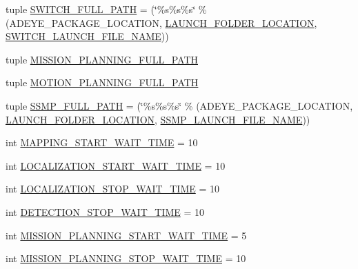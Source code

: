 \begin{DoxyCompactItemize}
\item 
tuple \hyperlink{namespacemanager_aa8c7bc9defad2d982a87f67d530919bc}{S\+W\+I\+T\+C\+H\+\_\+\+F\+U\+L\+L\+\_\+\+P\+A\+TH} = (\char`\"{}\%s\%s\%s\char`\"{} \% (A\+D\+E\+Y\+E\+\_\+\+P\+A\+C\+K\+A\+G\+E\+\_\+\+L\+O\+C\+A\+T\+I\+ON, \hyperlink{namespacemanager_aade405cb0881d91b45085d7bc0f392fa}{L\+A\+U\+N\+C\+H\+\_\+\+F\+O\+L\+D\+E\+R\+\_\+\+L\+O\+C\+A\+T\+I\+ON}, \hyperlink{namespacemanager_ac734eeabc7266313bdf84d100e8c5d77}{S\+W\+I\+T\+C\+H\+\_\+\+L\+A\+U\+N\+C\+H\+\_\+\+F\+I\+L\+E\+\_\+\+N\+A\+ME}))
\item 
tuple \hyperlink{namespacemanager_a3d3b5c1e3f4aa2f976afd6696fb753dc}{M\+I\+S\+S\+I\+O\+N\+\_\+\+P\+L\+A\+N\+N\+I\+N\+G\+\_\+\+F\+U\+L\+L\+\_\+\+P\+A\+TH}
\item 
tuple \hyperlink{namespacemanager_a53957d71bc1b0299a6de2499348c0c7b}{M\+O\+T\+I\+O\+N\+\_\+\+P\+L\+A\+N\+N\+I\+N\+G\+\_\+\+F\+U\+L\+L\+\_\+\+P\+A\+TH}
\item 
tuple \hyperlink{namespacemanager_af8b394f3a0664a2eb78bb3c7ec36dd97}{S\+S\+M\+P\+\_\+\+F\+U\+L\+L\+\_\+\+P\+A\+TH} = (\char`\"{}\%s\%s\%s\char`\"{} \% (A\+D\+E\+Y\+E\+\_\+\+P\+A\+C\+K\+A\+G\+E\+\_\+\+L\+O\+C\+A\+T\+I\+ON, \hyperlink{namespacemanager_aade405cb0881d91b45085d7bc0f392fa}{L\+A\+U\+N\+C\+H\+\_\+\+F\+O\+L\+D\+E\+R\+\_\+\+L\+O\+C\+A\+T\+I\+ON}, \hyperlink{namespacemanager_a48b997992b3e5973e9ccfe2ce7869790}{S\+S\+M\+P\+\_\+\+L\+A\+U\+N\+C\+H\+\_\+\+F\+I\+L\+E\+\_\+\+N\+A\+ME}))
\item 
int \hyperlink{namespacemanager_a114c53938453b5bea9a1d87feb0b8787}{M\+A\+P\+P\+I\+N\+G\+\_\+\+S\+T\+A\+R\+T\+\_\+\+W\+A\+I\+T\+\_\+\+T\+I\+ME} = 10
\item 
int \hyperlink{namespacemanager_a8bb090193ee690460b2d5da5d95d670a}{L\+O\+C\+A\+L\+I\+Z\+A\+T\+I\+O\+N\+\_\+\+S\+T\+A\+R\+T\+\_\+\+W\+A\+I\+T\+\_\+\+T\+I\+ME} = 10
\item 
int \hyperlink{namespacemanager_a8532d59e6a018744dbd2db6ffa66b1e1}{L\+O\+C\+A\+L\+I\+Z\+A\+T\+I\+O\+N\+\_\+\+S\+T\+O\+P\+\_\+\+W\+A\+I\+T\+\_\+\+T\+I\+ME} = 10
\item 
int \hyperlink{namespacemanager_a38f231e60cb3e2fa5c7a738460ddad61}{D\+E\+T\+E\+C\+T\+I\+O\+N\+\_\+\+S\+T\+O\+P\+\_\+\+W\+A\+I\+T\+\_\+\+T\+I\+ME} = 10
\item 
int \hyperlink{namespacemanager_a575cc129790b379cc97a6a24bf765f92}{M\+I\+S\+S\+I\+O\+N\+\_\+\+P\+L\+A\+N\+N\+I\+N\+G\+\_\+\+S\+T\+A\+R\+T\+\_\+\+W\+A\+I\+T\+\_\+\+T\+I\+ME} = 5
\item 
int \hyperlink{namespacemanager_a26d58788b212bc74577124e9ebd27801}{M\+I\+S\+S\+I\+O\+N\+\_\+\+P\+L\+A\+N\+N\+I\+N\+G\+\_\+\+S\+T\+O\+P\+\_\+\+W\+A\+I\+T\+\_\+\+T\+I\+ME} = 10

\end{DoxyCompactItemize}
